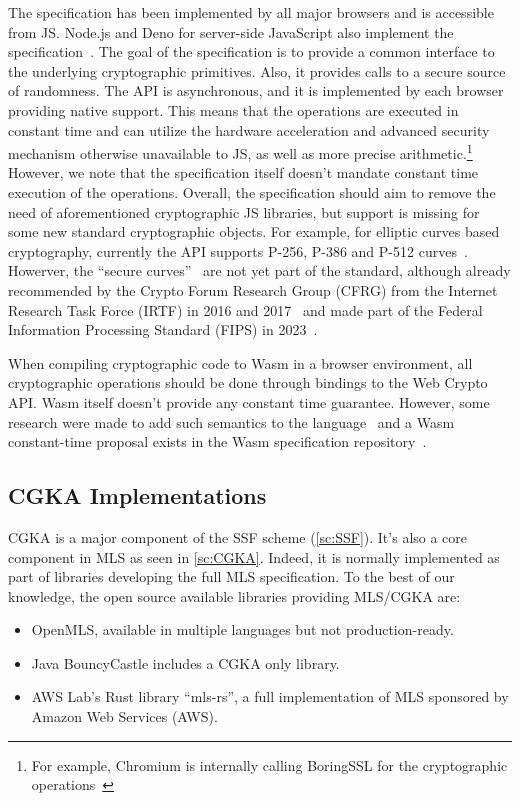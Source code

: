 The specification has been implemented by all major browsers
and is accessible from JS. 
Node.js and Deno for server-side JavaScript also implement the specification~\cite{NodeJsWebCryptoAPI, DenoWebCryptoAPI}.
The goal of the specification
is to provide a common interface to the underlying 
cryptographic primitives. Also, it provides calls to
a secure source of randomness. 
The API is asynchronous, and it is implemented by each
browser providing native support. This means that the
operations are executed in constant time and can
utilize the hardware acceleration and advanced
security mechanism otherwise unavailable to JS, as well as
more precise arithmetic.\footnote{For example, Chromium is internally calling BoringSSL for the cryptographic operations~\cite{ChromiumWebCryptoAPIImplementation}}
However, we note that the specification itself doesn't mandate
constant time execution of the operations.
Overall, the specification should aim to 
remove the need of aforementioned cryptographic JS libraries,
but support is missing for some new standard cryptographic objects. 
For example, for elliptic curves based cryptography, currently
the API supports P-256, P-386 and P-512 curves~\cite{WebCryptoAPICurvesSupport}.
Howerver, the ``secure curves''~\cite{WebCryptoAPISecureCurvesDraft,WebCryptoAPISecureCurvesExplainer}
are not yet part of the standard, although already recommended by
the Crypto Forum Research Group (CFRG) from the Internet Research
Task Force (IRTF) in 2016 and 2017~\cite{RFC7748IRTF, RFC8032IRTF}
and made part of the Federal Information Processing Standard (FIPS) in 2023~\cite{SecureCurvesNIST}.

When compiling cryptographic code to Wasm in a browser environment,
all cryptographic operations should be done through bindings to
the Web Crypto API. Wasm itself doesn't provide any constant time
guarantee. However, some research were made to add such semantics
to the language~\cite{CTWasm, gu2023constanttimewasmtimerealtime}
and a Wasm constant-time proposal exists in the Wasm specification
repository~\cite{WasmCTProposal}.

\subsection{CGKA Implementations}\label{sc:CGKA-implementations}

CGKA is a major component of the SSF scheme (\cref{sc:SSF}).
It's also a core component in MLS as seen in \cref{sc:CGKA}.
Indeed, it is normally implemented as part of libraries developing
the full MLS specification.
To the best of our knowledge, the open source available libraries
providing MLS/CGKA are:
\begin{itemize}
    \item OpenMLS, available in multiple languages but not production-ready.
    \item Java BouncyCastle includes a CGKA only library.
    \item AWS Lab's Rust library ``mls-rs'', a full implementation of MLS sponsored by Amazon Web Services (AWS). 
\end{itemize}

